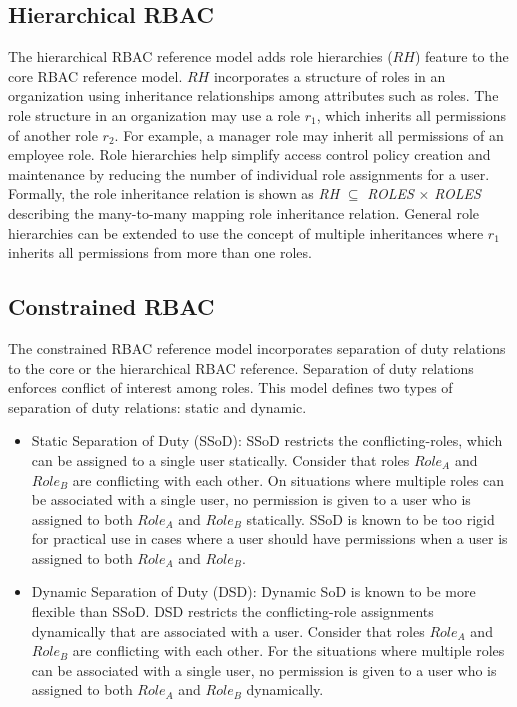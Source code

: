 \subsection{Hierarchical RBAC} 

The hierarchical RBAC reference model adds role hierarchies ($RH$) feature to the core RBAC reference model.
$RH$ incorporates a structure of roles in an organization using inheritance relationships among attributes such as roles.
The role structure in an organization may use
a role $r_1$, which inherits all permissions of another role $r_2$.
For example, a manager role may inherit all permissions of an employee role.
Role hierarchies help simplify access control policy creation and maintenance by reducing the number of
individual role assignments for a user. Formally, the role inheritance relation is shown as \textit{RH} $\subseteq$ \textit{ROLES} $\times$ \textit{ROLES} describing the many-to-many mapping role inheritance relation. 
General role hierarchies can be extended to use the concept of multiple inheritances where
$r_1$ inherits all permissions from more than one roles.


\subsection{Constrained RBAC}

The constrained RBAC reference model incorporates separation of duty relations to  the core or the hierarchical RBAC reference. Separation of 
duty relations enforces conflict of interest among roles. This model defines two types of separation of duty relations: static and dynamic.

\begin{itemize}
	\item Static Separation of Duty (SSoD): SSoD restricts the conflicting-roles, which can be assigned to a single user statically. Consider that roles $Role_A$ and $Role_B$ are conflicting with each other. On situations
	where multiple roles can be associated with a single user, no permission is given to a user who is assigned to both $Role_A$ and $Role_B$ statically. SSoD is known to be too rigid for practical use in cases where a user should have permissions when a user is assigned to both $Role_A$ and $Role_B$.
	\item Dynamic Separation of Duty (DSD): Dynamic SoD is known to be
more flexible than SSoD. DSD restricts the conflicting-role assignments dynamically that are associated with a user. Consider that roles $Role_A$ and $Role_B$ are conflicting with each other. For the situations where multiple roles can be associated with a single user, no permission is given to a user who is assigned to both $Role_A$ and $Role_B$ dynamically.	
\end{itemize}

